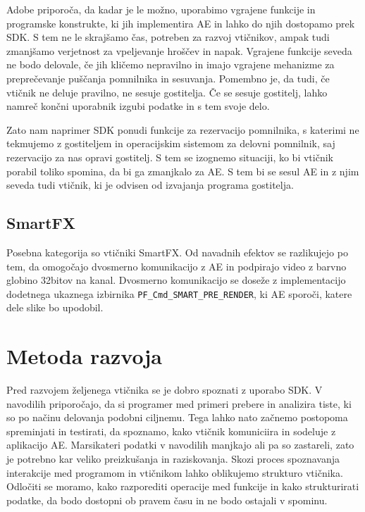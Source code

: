 \documentclass[a4paper, 12pt]{book}
\begin{document}

Adobe priporoča, da kadar je le možno, uporabimo vgrajene funkcije in programske konstrukte, ki jih implementira AE in lahko do njih dostopamo prek SDK. 
S tem ne le skrajšamo čas, potreben za razvoj vtičnikov, ampak tudi zmanjšamo verjetnost za vpeljevanje hroščev in napak. 
Vgrajene funkcije seveda ne bodo delovale, če jih kličemo nepravilno in imajo vgrajene mehanizme za preprečevanje puščanja pomnilnika in sesuvanja. 
Pomembno je, da tudi, če vtičnik ne deluje pravilno, ne sesuje gostitelja. 
Če se sesuje gostitelj, lahko namreč končni uporabnik izgubi podatke in s tem svoje delo. 

Zato nam naprimer SDK ponudi funkcije za rezervacijo pomnilnika, s katerimi ne tekmujemo z gostiteljem in operacijskim sistemom za delovni pomnilnik, saj rezervacijo za nas opravi gostitelj.
S tem se izognemo situaciji, ko bi vtičnik porabil toliko spomina, da bi ga zmanjkalo za AE. 
S tem bi se sesul AE in z njim seveda tudi vtičnik, ki je odvisen od izvajanja programa gostitelja.


\subsection{SmartFX} %

Posebna kategorija so vtičniki SmartFX. 
Od navadnih efektov se razlikujejo po tem, da omogočajo dvosmerno komunikacijo z AE in podpirajo video z barvno globino 32bitov na kanal. 
Dvosmerno komunikacijo se doseže z  implementacijo dodetnega ukaznega izbirnika {\tt PF\_Cmd\_SMART\_PRE\_RENDER}, ki AE sporoči, katere dele slike bo upodobil. 


\section{Metoda razvoja}

Pred razvojem željenega vtičnika se je dobro spoznati z uporabo SDK. 
V navodilih priporočajo, da si programer med primeri prebere in analizira tiste, ki so po načinu delovanja podobni ciljnemu. 
Tega lahko nato začnemo postopoma spreminjati in testirati, da spoznamo, kako vtičnik komuniciira in sodeluje z aplikacijo AE.
Marsikateri podatki v navodilih manjkajo ali pa so zastareli, zato je potrebno kar veliko preizkušanja in raziskovanja.  
Skozi proces spoznavanja interakcije med programom in vtičnikom lahko oblikujemo strukturo vtičnika. 
Odločiti se moramo, kako razporediti operacije med funkcije in kako  strukturirati podatke, da bodo dostopni ob pravem času in ne bodo ostajali v spominu. 
\end{document}
